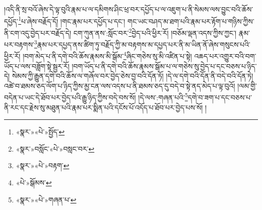 །འདི་ནི་སྲ་བའོ་ཞེས་དེ་ལྟ་བུའི་རྣམ་པ་ལ་དམིགས་ཤིང་ཕྲ་བར་དཔྱོད་པ་ལ་འཇུག་པ་ནི་སེམས་ལས་བྱུང་བའི་ཆོས་དཔྱོད་\footnote{«སྣར་»«པེ་»སྤྱོད་}པ་ཞེས་བརྗོད་དོ། །གང་རྣམ་པར་དཔྱོད་པ་དང་། གང་ཡང་བཤད་མ་ཐག་པའི་རྣམ་པར་རྟོག་པ་གཉིས་ཀྱིས་ནི་ངག་འདུ་བྱེད་པར་བརྗོད་དེ། ངག་ཀུན་ནས་:སློང་བར་\footnote{«སྣར་»བསློང་«པེ་»བསླང་བར་}བྱེད་པའི་ཕྱིར་རོ། །བཅོམ་ལྡན་འདས་ཀྱིས་ཀྱང་། རྣམ་པར་བརྟགས་\footnote{«སྣར་»«པེ་»བརྟག་}རྣམ་པར་དཔྱད་ནས་ཚིག་ཏུ་བརྗོད་ཀྱི་མ་བརྟགས་མ་དཔྱད་པར་ནི་མ་ཡིན་ནོ་ཞེས་གསུངས་པའི་ཕྱིར་རོ། །བག་མེད་པ་ནི་དགེ་བའི་ཆོས་རྣམས་མི་སྒོམ་\footnote{«པེ་»སྒོམས་}ཞིང་གཅེས་སུ་མི་འཛིན་པ་སྟེ། འཆད་པར་འགྱུར་བའི་བག་ཡོད་པ་ལས་བཟློག་སྟེ་སྦྱར་རོ། །བག་ཡོད་པ་ནི་དགེ་བའི་ཆོས་རྣམས་སྒོམ་པ་ལ་གཅེས་སུ་བྱེད་པ་དང་བཅས་པ་ཉིད་དེ། སེམས་ཀྱི་རྒྱུན་དགེ་བའི་ཆོས་ལ་གཞོལ་བར་བྱེད་ཅེས་བྱ་བའི་དོན་ཏོ། །དེ་ལ་དགེ་བའི་དོན་ནི་བདེ་བའི་དོན་ཏེ། འཚེ་བ་ཐམས་ཅད་ལོག་པ་ཉིད་ཀྱིས་མྱ་ངན་ལས་འདས་པ་ནི་ཐམས་ཅད་དུ་བདེ་བ་སྟེ་ནད་མེད་པ་ལྟ་བུའོ། །ལམ་གྱི་བདེན་པ་ཡང་དེ་ཐོབ་པར་བྱེད་པའི་རྒྱུ་ཉིད་ཀྱིས་བདེ་བས་སོ། །དེ་ལས་:གཞན་པའི་\footnote{«སྣར་»«པེ་»གཞན་པ་}དགེ་བ་ཟག་པ་དང་བཅས་པ་ནི་རང་དང་རྗེས་སུ་མཐུན་པའི་རྣམ་པར་སྨིན་པའི་དངོས་པོ་འདོད་པ་ཐོབ་པར་བྱེད་པས་སོ། །
